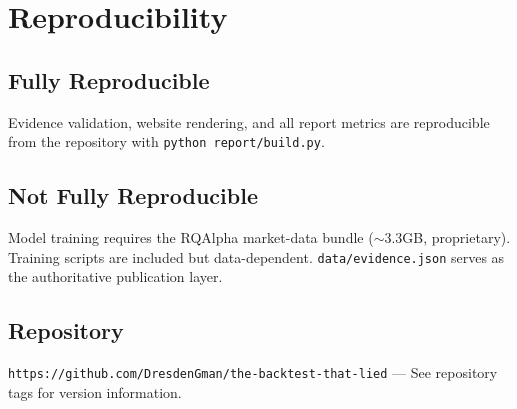 \section{Reproducibility}
\subsection{Fully Reproducible}
Evidence validation, website rendering, and all report metrics are reproducible from the repository with \texttt{python report/build.py}.

\subsection{Not Fully Reproducible}
Model training requires the RQAlpha market-data bundle ($\sim$3.3GB, proprietary). Training scripts are included but data-dependent. \texttt{data/evidence.json} serves as the authoritative publication layer.

\subsection{Repository}
\texttt{https://github.com/DresdenGman/the-backtest-that-lied} --- See repository tags for version information.
